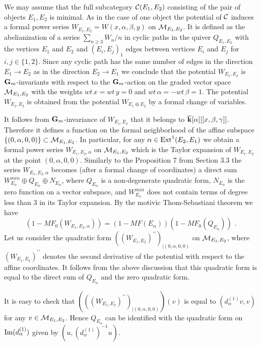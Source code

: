 \documentclass[12pt]{article}
\begin{document}
We may assume that the full subcategory ${\mathcal C}(E_1,E_2)$ consisting of the pair of objects $E_1,E_2$ is minimal.
As in the case of one object the  potential of ${\mathcal C}$ induces a formal power series $W_{E_1,E_2}=W(x,\alpha,\beta, y)$
on ${\cal M}_{E_1,E_2}$. It is defined as the abelianization of a series $\sum_{n\geqslant 3} W_n/n$ in cyclic paths in the quiver $Q_{E_1,E_2}$
with the vertices $E_1$ and $E_2$ and $(E_i,E_j)_1$ edges between vertices $E_i$ and $E_j$ for $i,j\in \{1,2\}$.
Since any cyclic path has the same number of edges in the direction $E_1\to E_2$ as in the direction $E_2\to E_1$ we conclude that the potential $W_{E_1,E_2}$ is ${\bf G}_m$-invariants with respect to the ${\bf G}_m$-action on the graded vector space ${\cal M}_{E_1,E_2}$ with the weights $wt\, x=wt\, y=0$ and $wt\, \alpha=-wt\, \beta=1$. The potential $W_{E_1,E_2}$ is obtained from the potential $W_{E_1\oplus E_2}$ by a formal change of variables.


It follows from ${\bf G}_m$-invariance of $W_{E_1,E_2}$ that it belongs to ${\overline{\bf k}}[\alpha][[x,\beta,\gamma]]$. Therefore it defines a function on the formal neighborhood of the affine subspace
$\{(0,\alpha,0,0)\}\subset {\cal M}_{E_1,E_2}$. In particular, for any $\alpha\in \operatorname{Ext}^1(E_2,E_1)$ we obtain a formal power series $W_{E_1,E_2,\alpha}$ on ${\cal M}_{E_1,E_2}$ which is the Taylor expansion of $W_{E_1,E_2}$ at the point
$(0,\alpha,0,0)$. Similarly to the Proposition 7 from Section 3.3 the series $W_{E_1,E_2,\alpha}$ becomes (after a formal change of coordinates) a direct sum $W_{E_{\alpha}}^{min}\oplus Q_{E_{\alpha}}\oplus N_{E_{\alpha}}$, where $Q_{E_{\alpha}}$ is a non-degenerate quadratic form, $N_{E_{\alpha}}$ is the zero function on a vector subspace, and $W_{E_{\alpha}}^{min}$ does not contain terms of degree less than $3$ in its Taylor expansion. By the motivic Thom-Sebastiani theorem we have 
$$(1-MF_0(W_{E_1,E_2,\alpha}))=(1-MF(E_{\alpha}))(1-MF_0(Q_{E_{\alpha}}))\,\,.$$ 
Let us consider the quadratic form
$((W_{E_1,E_2})^{\prime\prime})_{|(0,\alpha,0,0)}$
on ${\cal M}_{E_1,E_2}$, where $(W_{E_1,E_2})^{{\prime\prime}}$ denotes the second derivative of the  potential 
with respect to the  affine coordinates. It follows from the above discussion that this quadratic form is equal
to the direct sum of  $Q_{E_{\alpha}}$ and the zero quadratic form.

It is easy to check that $
\left(((W_{E_1,E_2})^{\prime\prime})_{|(0,\alpha,0,0)}\right)(v)$ is equal to
$(d_{\alpha}^{(1)}v,v)$ for any $ v\in {\cal M}_{E_1,E_2}$. Hence $Q_{E_{\alpha}}$ can be identified with the quadratic form on $\operatorname{I
m}(d_{\alpha}^{(1)})$ given by $(u, (d_{\alpha}^{(1)})^{-1}u)$.
\end{document}
